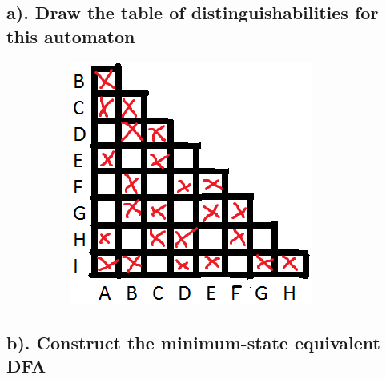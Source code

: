 \documentclass[20pt]{article} %
\begin{document}
\subsection{a). Draw the table of distinguishabilities for this automaton}
\begin{figure}[!htbp]
  	\centering
   	\begin{subfigure}[p]{0.4\linewidth}
    	\includegraphics[width=\linewidth]{./figures/h5-1.png}
   	\end{subfigure}
\end{figure} 
\subsection{b). Construct the minimum-state equivalent DFA}
\end{document}

